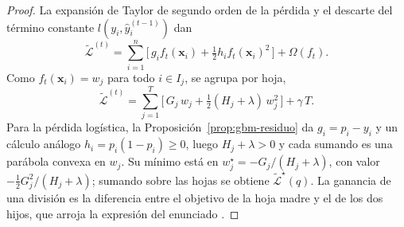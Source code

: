 \begin{proof}
La expansión de Taylor de segundo orden de la pérdida y el descarte del término constante $l(y_i, \widehat{y}_i^{(t-1)})$ dan
\[
\widetilde{\mathcal{L}}^{(t)} = \sum_{i=1}^{n} \big[\, g_i f_t(\mathbf{x}_i) + \tfrac{1}{2} h_i f_t(\mathbf{x}_i)^2 \,\big] + \Omega(f_t).
\]
Como $f_t(\mathbf{x}_i) = w_j$ para todo $i \in I_j$, se agrupa por hoja,
\[
\widetilde{\mathcal{L}}^{(t)} = \sum_{j=1}^{T} \Big[\, G_j\, w_j + \tfrac{1}{2}(H_j + \lambda)\, w_j^2 \,\Big] + \gamma\, T.
\]
Para la pérdida logística, la Proposición~\ref{prop:gbm-residuo} da $g_i = p_i - y_i$ y un cálculo análogo $h_i = p_i(1 - p_i) \ge 0$, luego $H_j + \lambda > 0$ y cada sumando es una parábola convexa en $w_j$. Su mínimo está en $w_j^{\star} = -G_j/(H_j + \lambda)$, con valor $-\tfrac{1}{2} G_j^2/(H_j + \lambda)$; sumando sobre las hojas se obtiene $\widetilde{\mathcal{L}}^{\star}(q)$. La ganancia de una división es la diferencia entre el objetivo de la hoja madre y el de los dos hijos, que arroja la expresión del enunciado \cite{chen2016}.
\end{proof}
